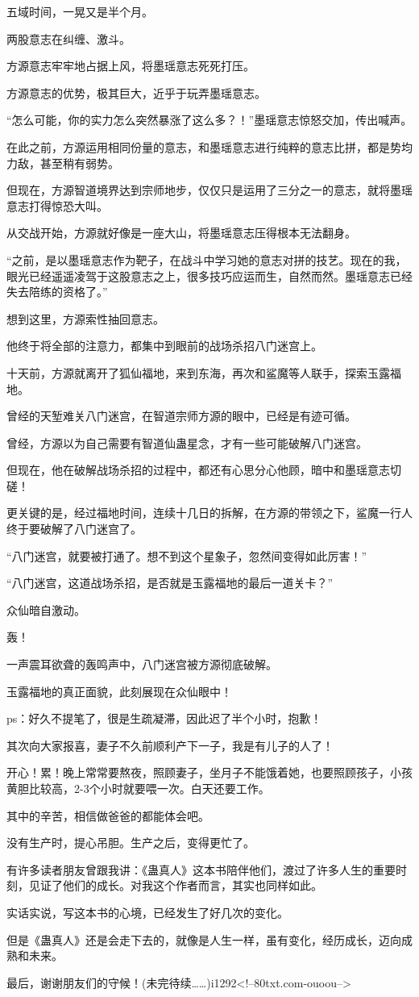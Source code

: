 \begin{this_body}
五域时间，一晃又是半个月。

两股意志在纠缠、激斗。

方源意志牢牢地占据上风，将墨瑶意志死死打压。

方源意志的优势，极其巨大，近乎于玩弄墨瑶意志。

“怎么可能，你的实力怎么突然暴涨了这么多？！”墨瑶意志惊怒交加，传出喊声。

在此之前，方源运用相同份量的意志，和墨瑶意志进行纯粹的意志比拼，都是势均力敌，甚至稍有弱势。

但现在，方源智道境界达到宗师地步，仅仅只是运用了三分之一的意志，就将墨瑶意志打得惊恐大叫。

从交战开始，方源就好像是一座大山，将墨瑶意志压得根本无法翻身。

“之前，是以墨瑶意志作为靶子，在战斗中学习她的意志对拼的技艺。现在的我，眼光已经遥遥凌驾于这股意志之上，很多技巧应运而生，自然而然。墨瑶意志已经失去陪练的资格了。”

想到这里，方源索性抽回意志。

他终于将全部的注意力，都集中到眼前的战场杀招八门迷宫上。

十天前，方源就离开了狐仙福地，来到东海，再次和鲨魔等人联手，探索玉露福地。

曾经的天堑难关八门迷宫，在智道宗师方源的眼中，已经是有迹可循。

曾经，方源以为自己需要有智道仙蛊星念，才有一些可能破解八门迷宫。

但现在，他在破解战场杀招的过程中，都还有心思分心他顾，暗中和墨瑶意志切磋！

更关键的是，经过福地时间，连续十几日的拆解，在方源的带领之下，鲨魔一行人终于要破解了八门迷宫了。

“八门迷宫，就要被打通了。想不到这个星象子，忽然间变得如此厉害！”

“八门迷宫，这道战场杀招，是否就是玉露福地的最后一道关卡？”

众仙暗自激动。

轰！

一声震耳欲聋的轰鸣声中，八门迷宫被方源彻底破解。

玉露福地的真正面貌，此刻展现在众仙眼中！

ps：好久不提笔了，很是生疏凝滞，因此迟了半个小时，抱歉！

其次向大家报喜，妻子不久前顺利产下一子，我是有儿子的人了！

开心！累！晚上常常要熬夜，照顾妻子，坐月子不能饿着她，也要照顾孩子，小孩黄胆比较高，2-3个小时就要喂一次。白天还要工作。

其中的辛苦，相信做爸爸的都能体会吧。

没有生产时，提心吊胆。生产之后，变得更忙了。

有许多读者朋友曾跟我讲：《蛊真人》这本书陪伴他们，渡过了许多人生的重要时刻，见证了他们的成长。对我这个作者而言，其实也同样如此。

实话实说，写这本书的心境，已经发生了好几次的变化。

但是《蛊真人》还是会走下去的，就像是人生一样，虽有变化，经历成长，迈向成熟和未来。

最后，谢谢朋友们的守候！(未完待续……)i1292<!--80txt.com-ouoou-->

\end{this_body}

